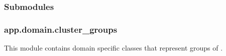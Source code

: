 \documentclass[letterpaper,10pt,english]{sphinxmanual}
\begin{document}
\subsubsection{Submodules}
\label{\detokenize{app.domain:submodules}}

\subsubsection{app.domain.cluster\_groups}
\label{\detokenize{app.domain:module-app.domain.cluster_groups}}\label{\detokenize{app.domain:app-domain-cluster-groups}}
This module contains domain specific classes that represent groups of
{\hyperref[\detokenize{app.domain:module-app.domain.network_nodes}]{}}.
\end{document}
